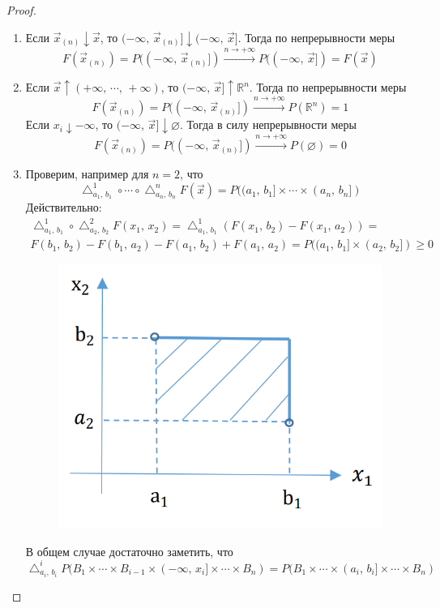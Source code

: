 \documentclass[a4paper,12pt]{article}
\renewcommand{\geq}{\ensuremath{\geqslant}}
\renewcommand{\emptyset}{\ensuremath{\varnothing}}
\theoremstyle{plain}
\theoremstyle{definition}
\theoremstyle{remark}
\begin{document}
\begin{proof}
	\begin{enumerate}
		\item Если $\vec{x}_{(n)} \downarrow \vec{x}$, то $(-\infty,\, \vec{x}_{(n)}] \downarrow (-\infty,\, \vec{x}]$. Тогда по непрерывности меры
		      \[
			      F(\vec{x}_{(n)}) = P((-\infty,\, \vec{x}_{(n)}]) \stackrel{n \to +\infty}{\to} P((-\infty,\, \vec{x}]) = F(\vec{x})
		      \]
		\item Если $\vec{x} \uparrow (+\infty,\,\cdots,\,+\infty)$, то $(-\infty,\, \vec{x}] \uparrow \mathbb{R}^n$. Тогда по непрерывности меры
		      \[F(\vec{x}_{(n)}) = P((-\infty,\, \vec{x}_{(n)}]) \stackrel{n \to +\infty}{\to} P(\mathbb{R}^n) = 1\]
		      Если $x_i \downarrow -\infty$, то $(-\infty,\, \vec{x}] \downarrow \emptyset$. Тогда в силу непрерывности меры
		      \[F(\vec{x}_{(n)}) = P((-\infty,\, \vec{x}_{(n)}]) \stackrel{n \to +\infty}{\to} P(\emptyset) = 0\]
		\item Проверим, например для $n = 2$, что
		      \[\bigtriangleup_{a_1,\,b_1}^1 \circ \cdots \circ \bigtriangleup_{a_n,\,b_n}^n F(\vec{x}) = P((a_1,\,b_1] \times\cdots\times (a_n,\,b_n])\]
		      Действительно:
		      \begin{align*}
			      \bigtriangleup^1_{a_1,\,b_1} \circ\bigtriangleup^2_{a_2,\,b_2} F(x_1,\,x_2) = \bigtriangleup^1_{a_1,\,b_1} (F(x_1,\,b_2) - F(x_1,\,a_2)) = \\
			      F(b_1,\,b_2) - F(b_1,\,a_2) - F(a_1,\,b_2) + F(a_1,\,a_2) = P((a_1,\,b_1] \times (a_2,\,b_2]) \geq 0
		      \end{align*}
		      \begin{figure}[h]
			      \includegraphics[scale=0.3]{img/f_example.png}
		      \end{figure}


		      В общем случае достаточно заметить, что
		      \[\bigtriangleup^i_{a_i,\,b_i}P(B_1\times\cdots\times B_{i - 1} \times (-\infty,\, x_i]\times\cdots\times B_n) = P(B_1\times\cdots\times(a_i,\,b_i]\times\cdots\times B_n)\]
	\end{enumerate}
\end{proof}
\end{document}
